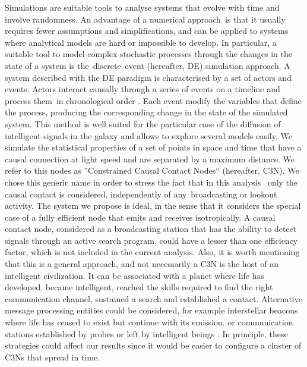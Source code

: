 \documentclass[crop]{CSLB}
\newcommand{\ceti}{C3N}
\newcommand{\cetis}{C3Ns}
\begin{document}
Simulations are suitable tools to analyse systems that evolve with time and
involve randomness.
%
An advantage of a numerical approach is that it usually requires fewer assumptions
and simplifications, and can be applied to systems where analytical models are
hard or impossible to develop.
%
In particular, a suitable tool to model complex stochastic processes through
the changes in the state of a system is the discrete--event (hereafter, DE)
simulation approach.
%
A system described with the DE paradigm is characterised by a set of actors and
events.
%
Actors interact causally through a series of events on a timeline and process
them in chronological order \citep{ptolemaeus_system_2014,
chung_simulation_2003, ross_simulation_2012}.
%
Each event modify the variables that define the process, producing the
corresponding change in the state of the simulated system.
%
This method is well suited for the particular case of the diffusion of
intelligent signals in the galaxy and allows to explore several models easily.
%
We simulate the statistical properties of a set of points in space and time
that have a causal connection at light speed and are separated
by a maximum distance.
%
We refer to this nodes as ''Constrained Causal Contact Nodes``
(hereafter, \ceti{}).
%
We chose this generic name in order to stress the fact that in this analysis 
only the causal contact is considered, independently of any broadcasting or
lookout activity.
%
The system we propose is ideal, in the sense that it considers the special case
of a fully efficient node that emits and receives isotropically.
%
A causal contact node, considered as a broadcasting station that has the
ability to detect signals through an active search program, could have a
lesser than one efficiency factor, which is not included in the current
analysis.
%
Also, it is worth mentioning that this is a general approach, and not
necessarily a \ceti{} is the host of an intelligent civilization.
%
It can be associated with a planet where life has developed,
became intelligent, reached the skills required to find the right communication
channel, sustained a search and established a contact.
%
Alternative message processing entities could be considered, for example
interstellar beacons where life has ceased to exist but continue with its
emission, or communication stations established by probes or left by
intelligent beings \citep[see, e.g., ][]{peters_outer_2018,
barlow_galactic_2013}.
%
In principle, these strategies could affect our results since it would be
easier to configure a cluster of \cetis{} that spread in time.
\end{document}
